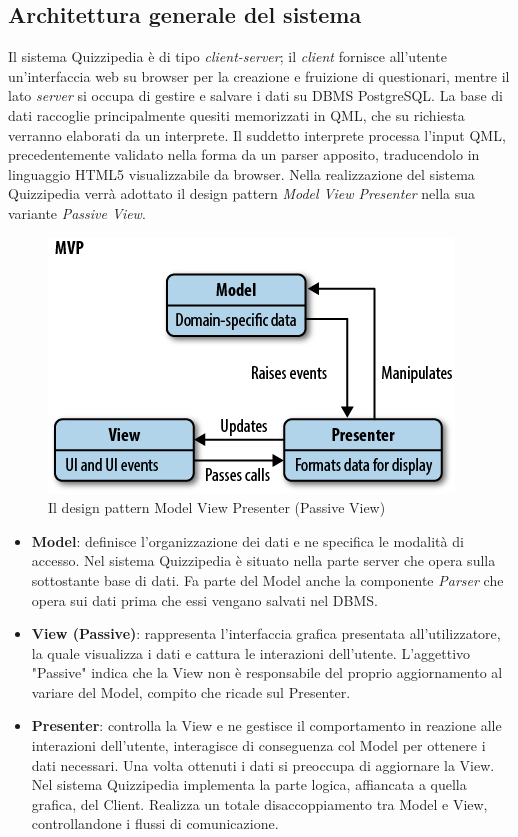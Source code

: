 \documentclass[a4paper,11pt]{article}
\begin{document}
	\subsection{Architettura generale del sistema}
	Il sistema Quizzipedia è di tipo \emph{client-server}; il \emph{client} fornisce all'utente un'interfaccia web su browser per la creazione e fruizione di questionari, mentre il lato \emph{server} si occupa di gestire e salvare i dati su DBMS PostgreSQL. La base di dati raccoglie principalmente quesiti memorizzati in QML, che su richiesta verranno elaborati da un interprete.
Il suddetto interprete processa l'input QML, precedentemente validato nella forma da un parser apposito, traducendolo in linguaggio HTML5 visualizzabile da browser.
Nella realizzazione del sistema Quizzipedia verrà adottato il design pattern \emph{Model View Presenter} nella sua variante \emph{Passive View}.
\begin{figure}[h!]
\begin{center}
	\includegraphics[scale=1.3]{../images/mvp.png}
	\caption{Il design pattern Model View Presenter (Passive View)}
\end{center}
\end{figure}
\begin {itemize}
\item\textbf{Model}: definisce l'organizzazione dei dati e ne specifica le modalità di accesso. Nel sistema Quizzipedia è situato nella parte server che opera sulla sottostante base di dati. Fa parte del Model anche la componente \emph{Parser} che opera sui dati prima che essi vengano salvati nel DBMS.
\item\textbf{View (Passive)}: rappresenta l'interfaccia grafica presentata all'utilizzatore, la quale visualizza i dati e cattura le interazioni dell'utente. L'aggettivo "Passive" indica che la View non è responsabile del proprio aggiornamento al variare del Model, compito che ricade sul Presenter.
\item\textbf{Presenter}: controlla la View e ne gestisce il comportamento in reazione alle interazioni dell'utente, interagisce di conseguenza col Model per ottenere i dati necessari.
Una volta ottenuti i dati si preoccupa di aggiornare la View. Nel sistema Quizzipedia implementa la parte logica, affiancata a quella grafica, del Client. Realizza un totale disaccoppiamento tra Model e View, controllandone i flussi di comunicazione.
	\end {itemize}
\end{document}
